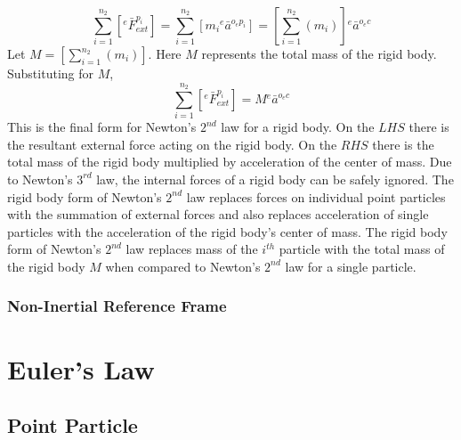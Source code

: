 \documentclass[a4paper, 12pt]{report}
\begin{document}
\begin{center}
$$\sum^{n_{2}}_{i = 1}\left[{}^{e}\bar{F}^{p_{i}}_{ext}\right] = \sum^{n_{2}}_{i = 1}\left[m_{i}{}^{e}\bar{a}^{o_{e}p_{i}}\right] = \left[\sum^{n_{2}}_{i = 1}\left(m_{i}\right)\right]{}^{e}\bar{a}^{o_{e}c}$$
Let $\displaystyle M = \left[\sum^{n_{2}}_{i = 1}\left(m_{i}\right)\right]$. Here $M$ represents the total mass of the rigid body. Substituting for $M$,
$$\sum^{n_{2}}_{i = 1}\left[{}^{e}\bar{F}^{p_{i}}_{ext}\right] = M{}^{e}\bar{a}^{o_{e}c}$$
This is the final form for Newton's $2^{nd}$ law for a rigid body. On the $LHS$ there is the resultant external force acting on the rigid body. On the $RHS$ there is the total mass of the rigid body multiplied by acceleration of the center of mass. Due to Newton's $3^{rd}$ law, the internal forces of a rigid body can be safely ignored. The rigid body form of Newton's $2^{nd}$ law replaces forces on individual point particles with the summation of external forces and also replaces acceleration of single particles with the acceleration of the rigid body's center of mass. The rigid body form of Newton's $2^{nd}$ law replaces mass of the $i^{th}$ particle with the total mass of the rigid body $M$ when compared to Newton's $2^{nd}$ law for a single particle.
\subsubsection{Non-Inertial Reference Frame}
\begin{comment}
\end{comment}

\section{Euler's Law}
\begin{comment}
\end{comment}
\subsection{Point Particle}
\begin{comment}
\end{comment}

\end{center}
\end{document}
